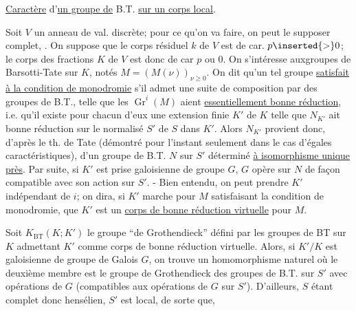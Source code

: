 \uline{Caractère} d'\uline{un groupe de} B.T. \uline{sur un corps local}.

Soit $V$ un anneau de val. discrète; pour ce qu'on va faire, on peut le supposer complet, . On suppose que le corps résiduel $k$ de $V$ est de car. $p\inserted{>}0$; le corps des fractions $K$ de $V$ est donc de car $p$ ou $0$. On  s'intéresse auxgroupes de Barsotti-Tate sur $K$, notés $M=(M(\nu))_{\nu\geq0}$. On dit qu'un tel groupe \uline{satisfait à la condition de monodromie} s'il admet une suite de composition par des groupes de B.T., telle que les $\operatorname{Gr}^i(M)$ aient \uline{essentiellement bonne réduction}, i.e. qu'il existe pour chacun d'eux une extension finie  $K'$ de $K$ telle que  $N_{K'}$ ait bonne réduction sur le normalisé $S'$ de $S$ dans $K'$. Alors $N_{K'}$ provient  donc, d'après le th. de Tate (démontré pour l'instant seulement dans le cas d'égales caractéristiques), d'un  groupe de B.T. $N$ sur $S'$ déterminé \uline{à isomorphisme unique près}. Par suite, si $K'$ est prise galoisienne de groupe $G$, $G$ opère sur  $N$ de façon compatible avec son action sur $S'$. - Bien entendu, on peut prendre $K'$ indépendant de $i$; on dira, si $K'$ marche pour $M$ satisfaisant la condition de monodromie, que $K'$ est un \uline{corps de bonne réduction virtuelle} pour $M$.

Soit $K_{\mathrm{BT}}(K;K')$ le groupe ``de Grothendieck''  défini par les groupes de BT sur $K$ admettant $K'$ comme corps de bonne réduction virtuelle. Alors, si $K'/K$ est galoisienne de groupe de Galois $G$, on trouve un homomorphisme naturel
où le deuxième membre est le groupe de Grothendieck des groupes de B.T. sur $S'$ avec opérations de $G$ (compatibles aux opérations de $G$ sur $S'$). D'ailleurs, $S$ étant complet donc hensélien, $S'$ est local, de sorte que,
